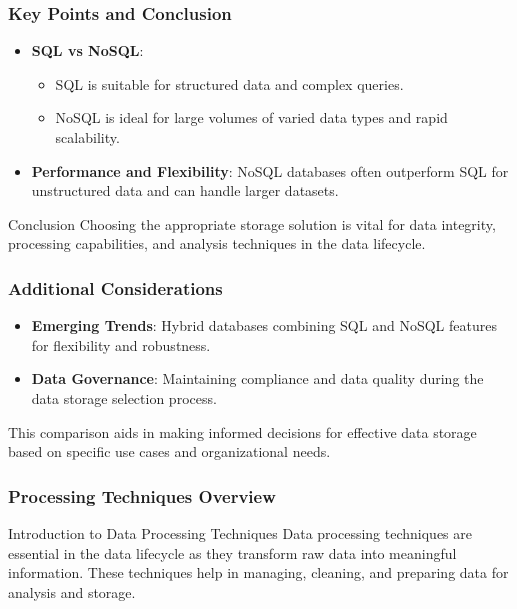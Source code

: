 \documentclass[aspectratio=169]{beamer}
\begin{document}
\begin{frame}[fragile]
    \frametitle{Key Points and Conclusion}
    \begin{itemize}
        \item \textbf{SQL vs NoSQL}: 
        \begin{itemize}
            \item SQL is suitable for structured data and complex queries.
            \item NoSQL is ideal for large volumes of varied data types and rapid scalability.
        \end{itemize}
        \item \textbf{Performance and Flexibility}: 
        NoSQL databases often outperform SQL for unstructured data and can handle larger datasets.
    \end{itemize}
    \begin{block}{Conclusion}
        Choosing the appropriate storage solution is vital for data integrity, processing capabilities, and analysis techniques in the data lifecycle.
    \end{block}
\end{frame}

\begin{frame}[fragile]
    \frametitle{Additional Considerations}
    \begin{itemize}
        \item \textbf{Emerging Trends}: Hybrid databases combining SQL and NoSQL features for flexibility and robustness.
        \item \textbf{Data Governance}: Maintaining compliance and data quality during the data storage selection process.
    \end{itemize}
    This comparison aids in making informed decisions for effective data storage based on specific use cases and organizational needs.
\end{frame}

\begin{frame}
  \frametitle{Processing Techniques Overview}
  \begin{block}{Introduction to Data Processing Techniques}
    Data processing techniques are essential in the data lifecycle as they transform raw data into meaningful information. These techniques help in managing, cleaning, and preparing data for analysis and storage.
  \end{block}
\end{frame}
\end{document}
